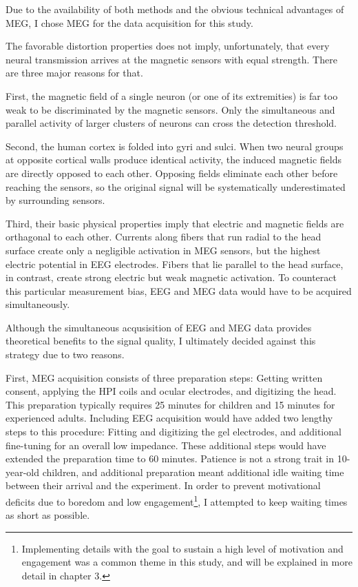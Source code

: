 Due to the availability of both methods and the obvious technical advantages of MEG, I chose MEG for the data acquisition for this study.


The favorable distortion properties does not imply, unfortunately, that every neural transmission arrives at the magnetic sensors with equal strength.
There are three major reasons for that.

First, the magnetic field of a single neuron (or one of its extremities) is far too weak to be discriminated by the magnetic sensors.
Only the simultaneous and parallel activity of larger clusters of neurons can cross the detection threshold.

Second, the human cortex is folded into gyri and sulci.
When two neural groups at opposite cortical walls produce identical activity, the induced magnetic fields are directly opposed to each other.
Opposing fields eliminate each other before reaching the sensors, so the original signal will be systematically underestimated by surrounding sensors.

Third, their basic physical properties imply that electric and magnetic fields are orthagonal to each other.
Currents along fibers that run radial to the head surface create only a negligible activation in MEG sensors, but the highest electric potential in EEG electrodes.
Fibers that lie parallel to the head surface, in contrast, create strong electric but weak magnetic activation.
To counteract this particular measurement bias, EEG and MEG data would have to be acquired simultaneously.


Although the simultaneous acqusisition of EEG and MEG data provides theoretical benefits to the signal quality, I ultimately decided against this strategy due to two reasons.

First, MEG acquisition consists of three preparation steps: Getting written consent, applying the HPI coils and ocular electrodes, and digitizing the head.
This preparation typically requires 25 minutes for children and 15 minutes for experienced adults.
Including EEG acquisition would have added two lengthy steps to this procedure: Fitting and digitizing the gel electrodes, and additional fine-tuning for an overall low impedance.
These additional steps would have extended the preparation time to 60 minutes.
Patience is not a strong trait in 10-year-old children, and additional preparation meant additional idle waiting time between their arrival and the experiment.
In order to prevent motivational deficits due to boredom and low engagement\footnote{Implementing details with the goal to sustain a high level of motivation and engagement was a common theme in this study, and will be explained in more detail in chapter 3.}, I attempted to keep waiting times as short as possible.

